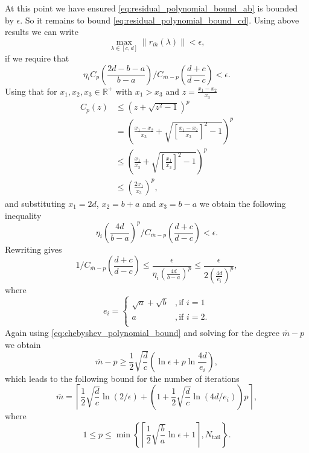 At this point we have ensured \cref{eq:residual_polynomial_bound_ab} is bounded by $\epsilon$. So it remains to bound \cref{eq:residual_polynomial_bound_cd}. Using above results we can write 
\begin{equation*}
    \max_{\lambda \in [c,d]} \|r_{\bar{m}}(\lambda)\| < \epsilon,
\end{equation*}
if we require that
\begin{equation}
    \eta_i C_{p}\left(\frac{2d - b - a}{b - a}\right) /C_{\bar{m}-p}\left(\frac{d+c}{d-c}\right) < \epsilon.
    \label{eq:relative_error_bound_mp}
\end{equation}
Using that for $x_1, x_2, x_3 \in \mathbb{R}^+$ with $x_1 > x_3$ and $z = \frac{x_1 - x_2}{x_3}$
\begin{align*}
    C_p(z) & \leq \left(z + \sqrt{z^2 - 1}\right)^p \\
    & = \left( \frac{x_1 - x_2}{x_3} + \sqrt{ \left[\frac{x_1 - x_2}{x_3}\right]^2 -1}\right)^p \\
    & \leq \left( \frac{x_1}{x_3} + \sqrt{ \left[\frac{x_1}{x_3}\right]^2 - 1}\right)^p \\
    & \leq \left( \frac{2x_1}{x_3}\right)^p,
\end{align*}
and substituting $x_1 = 2d$, $x_2 = b + a$ and $x_3 = b - a$ we obtain the following inequality
\begin{equation*}
    \eta_i \left(\frac{4d}{b-a} \right)^p /C_{\bar{m}-p}\left(\frac{d+c}{d-c}\right) < \epsilon. 
\end{equation*}
Rewriting gives
\[
    1/C_{\bar{m}-p}\left(\frac{d+c}{d-c}\right) \leq \frac{\epsilon}{\eta_i \left(\frac{4d}{b-a} \right)^p} \leq \frac{\epsilon}{2\left( \frac{4d}{e_i}\right)^p},
\]
where 
\[
    e_i = \begin{cases}
        \sqrt{a} + \sqrt{b} &, \text{if } i = 1\\
        a &, \text{if } i = 2.\\
    \end{cases}
\]
Again using \cref{eq:chebyshev_polynomial_bound} and solving for the degree $\bar{m} - p$ we obtain
\[
    \bar{m} - p \geq \frac{1}{2}\sqrt{\frac{d}{c}}\left(\ln{\epsilon} + p \ln{\frac{4d}{e_i}}\right),
\]
which leads to the following bound for the number of iterations
\begin{equation}
    \bar{m}=\left\lceil\frac{1}{2} \sqrt{\frac{d}{c}} \ln (2 / \epsilon)+\left(1+\frac{1}{2} \sqrt{\frac{d}{c}} \ln (4 d / e_i)\right) p\right\rceil,
    \label{eq:cg_iteration_bound_2_clusters}
\end{equation}
where 
\[
    1 \leq p \leq \min\left\{\left\lceil\frac{1}{2}\sqrt{\frac{b}{a}}\ln{\epsilon} + 1\right\rceil, N_{\text{tail}}\right\}.
\]

